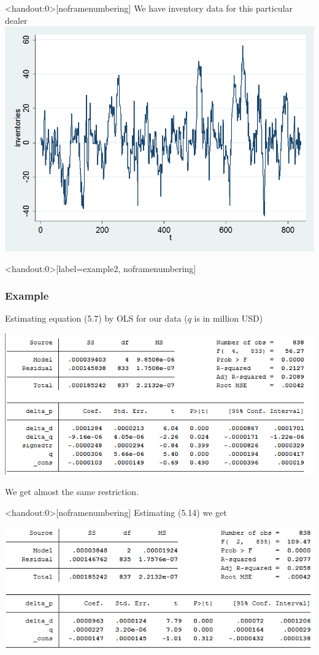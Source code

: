 \documentclass[english,10pt]{beamer}
\begin{document}
\begin{frame}<handout:0>[noframenumbering]
We have inventory data for this particular dealer
\center
\includegraphics[scale=0.3]{pics/inventory}
\hyperlink{theory}{}
\end{frame}


\begin{frame}<handout:0>[label=example2, noframenumbering]
\frametitle{Example}
Estimating equation (5.7) by OLS for our data ($q$ is in million USD)
\quad
\begin{center}
\includegraphics[scale=0.5]{pics/eq57}
\end{center}
We get almost the same restriction.
\end{frame}


\begin{frame}<handout:0>[noframenumbering]
Estimating (5.14) we get
\quad
\begin{center}
\includegraphics[scale=0.5]{pics/eq514}
\end{center}
\hyperlink{base}{}
\end{frame}
\end{document}
